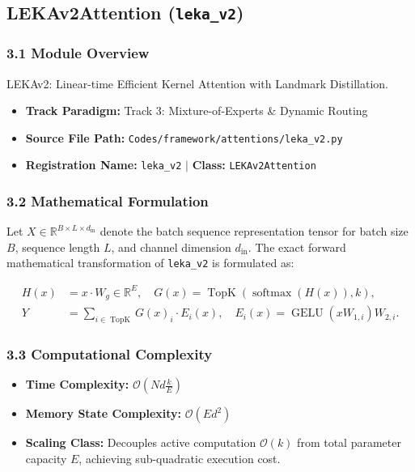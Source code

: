 \subsection{LEKAv2Attention (\texttt{leka\_v2})}
\label{sec:app_module_leka_v2}

\subsubsection*{3.1 Module Overview}
LEKAv2: Linear-time Efficient Kernel Attention with Landmark Distillation.
\begin{itemize}
    \item \textbf{Track Paradigm:} Track 3: Mixture-of-Experts \& Dynamic Routing
    \item \textbf{Source File Path:} \texttt{Codes/framework/attentions/leka\_v2.py}
    \item \textbf{Registration Name:} \texttt{leka\_v2} $\mid$ \textbf{Class:} \texttt{LEKAv2Attention}
\end{itemize}

\subsubsection*{3.2 Mathematical Formulation}
Let $X \in \mathbb{R}^{B \times L \times d_{\text{in}}}$ denote the batch sequence representation tensor for batch size $B$, sequence length $L$, and channel dimension $d_{\text{in}}$. The exact forward mathematical transformation of \texttt{leka\_v2} is formulated as:

\begin{align}
H(x) &= x \cdot W_g \in \mathbb{R}^{E}, \quad G(x) = \operatorname{TopK}\left(\operatorname{softmax}(H(x)), k\right), \\
Y &= \sum_{i \in \operatorname{TopK}} G(x)_i \cdot E_i(x), \quad E_i(x) = \operatorname{GELU}(x W_{1, i}) W_{2, i}.
\end{align}


\subsubsection*{3.3 Computational Complexity}
\begin{itemize}
    \item \textbf{Time Complexity:} $\mathcal{O}(N d \frac{k}{E})$
    \item \textbf{Memory State Complexity:} $\mathcal{O}(E d^2)$
    \item \textbf{Scaling Class:} Decouples active computation $\mathcal{O}(k)$ from total parameter capacity $E$, achieving sub-quadratic execution cost.
\end{itemize}

